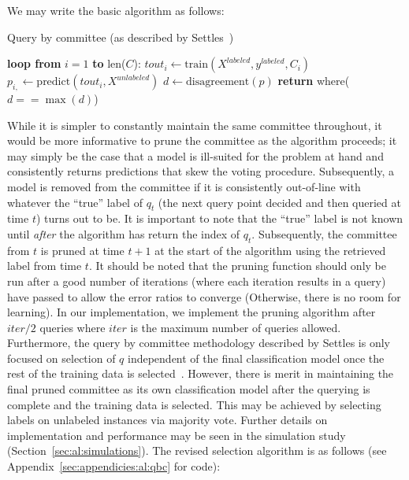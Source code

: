 We may write the basic algorithm as follows:

\tablespacing
\begin{algorithm}[H]
	\caption{Query by committee (as described by 
	Settles~\cite{settles2010})}\label{alg:al:methods:qbc1}
	\begin{algorithmic}[1]
		\State \textbf{loop from} $i=1$ \textbf{to} len($C$):
		\State \indent $\textit{tout}_{i} \gets 
		\text{train}(X^{labeled},y^{labeled},C_i)$
		\State \indent $p_{i,} \gets 
		\text{predict}(\textit{tout}_i,X^{unlabeled})$
		\State $d \gets \text{disagreement}(p)$
		\State \textbf{return} where($d==\max{(d)}$)
		\EndProcedure
	\end{algorithmic}
\end{algorithm}
\bodyspacing

\noindent While it is simpler to constantly maintain the same committee 
throughout, it would be more informative to prune the committee as the 
algorithm proceeds; it may simply be the case that a model is ill-suited for 
the problem at hand and consistently returns predictions that skew the voting 
procedure. Subsequently, a model is removed from the committee if it is 
consistently out-of-line with whatever the ``true'' label of $q_t$ (the next 
query point decided and then queried at time $t$) turns out to be. It is 
important to note that the ``true'' label is not known until \textit{after} the 
algorithm has return the index of $q_t$. Subsequently, the committee from $t$ 
is pruned at time $t+1$ at the start of the algorithm using the retrieved 
label from time $t$. It should be noted that the pruning function should only 
be run after a good number of iterations (where each iteration results in a 
query) have passed to allow the error ratios to converge (Otherwise, there is 
no room for learning). In our implementation, we implement the pruning 
algorithm after $iter/2$ queries where $iter$ is the maximum number of queries 
allowed.
Furthermore, the query by committee methodology described by Settles is only 
focused on selection of $q$ independent of the final classification model 
once the rest of the training data is selected~\cite{settles2010}. However, 
there is merit in maintaining the final pruned committee as its own 
classification model after the querying is complete and the training data is 
selected. This may be achieved by selecting labels on unlabeled instances via 
majority vote. Further details on implementation and performance may be seen in 
the simulation study (Section~\ref{sec:al:simulations}). The revised selection 
algorithm is as follows (see Appendix~\ref{sec:appendicies:al:qbc} for code):

